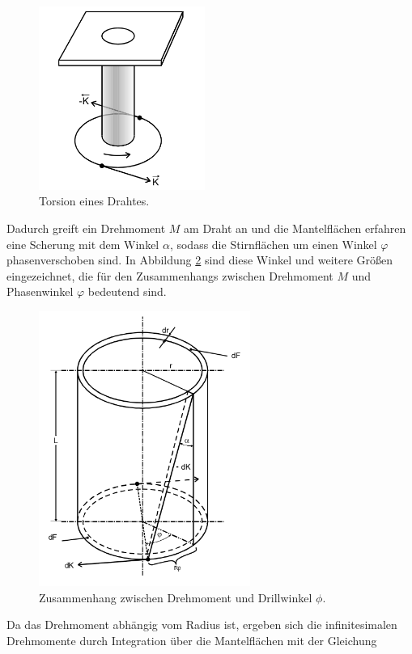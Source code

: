 \begin{figure}
  \centering
  \includegraphics[height=6cm]{Drahttorsion.png}
  \caption{Torsion eines Drahtes.}
  \label{fig:Torsion}
\end{figure}

Dadurch greift ein Drehmoment $M$ am Draht an und die
Mantelflächen erfahren eine Scherung mit dem Winkel $\alpha$, sodass die
Stirnflächen um einen Winkel $\varphi$ phasenverschoben sind.
In Abbildung \ref{fig:TorsionMantel} sind diese Winkel und weitere Größen
eingezeichnet, die für den Zusammenhangs zwischen Drehmoment $M$
und Phasenwinkel $\varphi$ bedeutend sind.

\newpage

\begin{figure}
  \centering
  \includegraphics[height=9cm]{SkizzeFormel.png}
  \caption{Zusammenhang zwischen Drehmoment und Drillwinkel $\phi$.}
  \label{fig:TorsionMantel}
\end{figure}

Da das Drehmoment abhängig vom Radius ist, ergeben sich die infinitesimalen
Drehmomente durch Integration über die Mantelflächen mit der Gleichung

